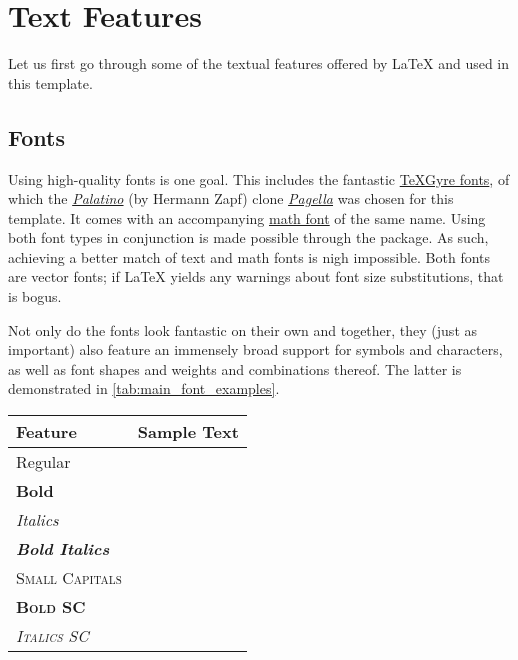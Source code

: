 \chapter{Text Features}\label{ch:text}
Let us first go through some of the textual features offered by \LaTeX{} and used in this template.

\section{Fonts}
Using high-quality fonts is one goal.
This includes the fantastic \href{https://ctan.org/texarchive/fonts/tex-gyre/opentype}{\TeX Gyre fonts}, of which the \textit{\href{https://en.wikipedia.org/wiki/Palatino}{Palatino}} (by Hermann Zapf) clone \textit{\href{https://ctan.org/pkg/tex-gyre-pagella}{Pagella}} was chosen for this template.
It comes with an accompanying \href{https://ctan.org/texarchive/fonts/tex-gyre-math/opentype}{math font} of the same name.
Using both font types in conjunction is made possible through the  package.
As such, achieving a better match of text and math fonts is nigh impossible.
Both fonts are vector fonts; if \LaTeX{} yields any warnings about font size substitutions, that is bogus.

Not only do the fonts look fantastic on their own and together, they (just as important) also feature an immensely broad support for symbols and characters, as well as font shapes and weights and combinations thereof.
The latter is demonstrated in \cref{tab:main_font_examples}.
%
\begin{table}
%
{%
	\begin{tabular}{@{}ll@{}}%
		\toprule
			Feature & Sample Text\\
		\midrule
			Regular & \sampletext\\
			\textbf{Bold} & \textbf{\sampletext}\\
			\textit{Italics} & \textit{\sampletext}\\
			\textbf{\textit{Bold Italics}} & \textbf{\textit{\sampletext}}\\
		\addlinespace%
			\textsc{Small Capitals} & \textsc{\sampletext}\\
			\textbf{\textsc{Bold SC}} & \textbf{\textsc{\sampletext}}\\
			\textit{\textsc{Italics SC}} & \textit{\textsc{\sampletext}}\\
		\bottomrule
	\end{tabular}
}%
\end{table}

